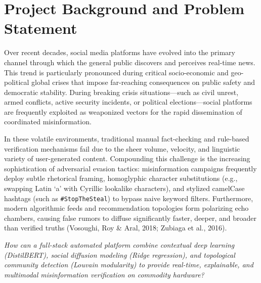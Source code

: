 \documentclass[11pt, a4paper]{article}
\newcommand{\code}[1]{\texttt{\small #1}}
\begin{document}
\section{Project Background and Problem Statement}
\label{sec:background}

Over recent decades, social media platforms have evolved into the primary channel through which the general public discovers and perceives real-time news. This trend is particularly pronounced during critical socio-economic and geo-political global crises that impose far-reaching consequences on public safety and democratic stability. During breaking crisis situations---such as civil unrest, armed conflicts, active security incidents, or political elections---social platforms are frequently exploited as weaponized vectors for the rapid dissemination of coordinated misinformation.

In these volatile environments, traditional manual fact-checking and rule-based verification mechanisms fail due to the sheer volume, velocity, and linguistic variety of user-generated content. Compounding this challenge is the increasing sophistication of adversarial evasion tactics: misinformation campaigns frequently deploy subtle rhetorical framing, homoglyphic character substitutions (e.g., swapping Latin `a' with Cyrillic lookalike characters), and stylized camelCase hashtags (such as \code{\#StopTheSteal}) to bypass naive keyword filters. Furthermore, modern algorithmic feeds and recommendation topologies form polarizing echo chambers, causing false rumors to diffuse significantly faster, deeper, and broader than verified truths (Vosoughi, Roy \& Aral, 2018; Zubiaga et al., 2016).

\begin{tcolorbox}[academicbox, title=\textbf{Core Research Question \& Technological Innovation}]
  \textit{How can a full-stack automated platform combine contextual deep learning (DistilBERT), social diffusion modeling (Ridge regression), and topological community detection (Louvain modularity) to provide real-time, explainable, and multimodal misinformation verification on commodity hardware?}
\end{tcolorbox}
\end{document}
